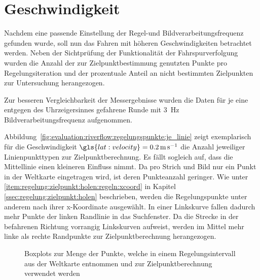 \section{Geschwindigkeit}
\label{ssec:evaluation:messungen:geschwindigkeit}

Nachdem eine passende Einstellung der Regel-und Bildverarbeitungsfrequenz gefunden wurde, soll nun das Fahren mit höheren Geschwindigkeiten betrachtet werden. Neben der Sichtprüfung der Funktionalität der Fahrspurverfolgung wurden die Anzahl der zur Zielpunktbestimmung genutzten Punkte pro Regelungsiteration und der prozentuale Anteil an nicht bestimmten Zielpunkten zur Untersuchung herangezogen. 

Zur besseren Vergleichbarkeit der Messergebnisse wurden die Daten für je eine entgegen des Uhrzeigersinnes gefahrene Runde mit \SI{3}{\hertz} Bildverarbeitungsfrequenz aufgenommen.

Abbildung~\ref{fig:evaluation:riverflow:regelungspunkte:je_linie} zeigt exemplarisch für die Geschwindigkeit \( \gls{lat:velocity} = 
\SI{0,2}{\metre\per\second} \) die  Anzahl jeweiliger Linienpunkttypen zur Zielpunktberechnung. Es fällt sogleich auf, dass die Mittellinie einen kleineren Einfluss nimmt. Da pro Strich und Bild nur ein Punkt in der Weltkarte 
eingetragen wird, ist deren Punkteanzahl geringer. Wie unter 
\ref{item:regelung:zielpunkt:holen:regeln:xcoord} in Kapitel 
\ref{ssec:regelung:zielpunkt:holen} beschrieben, werden die Regelungspunkte unter anderem nach ihrer x-Koordinate ausgewählt. In einer Linkskurve fallen dadurch mehr Punkte der linken Randlinie in das Suchfenster. Da die Strecke in 
der befahrenen Richtung vorrangig Linkskurven aufweist, werden im Mittel mehr linke als rechte Randpunkte zur Zielpunktberechnung herangezogen.

\begin{figure}[htbp] %
	\centering
	\hfill
	\caption{Boxplots zur Menge der Punkte, welche in einem Regelungsintervall 
	aus der Weltkarte entnommen und zur Zielpunktberechnung verwendet werden}
	\label{fig:evaluation:riverflow:regelungspunkte}
\end{figure}

